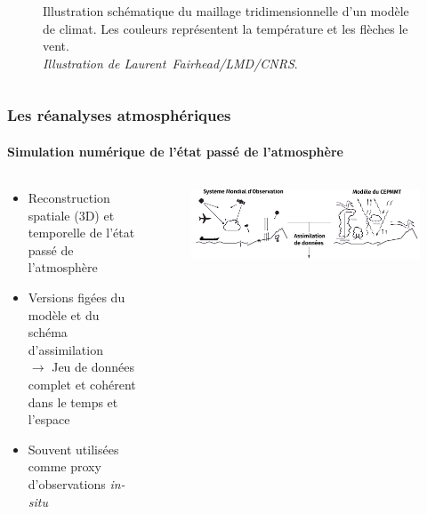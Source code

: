\documentclass[aspectratio=169, usepdftitle=false, xcolor={dvipsnames}, 9pt,table]{beamer}
\begin{document}
\begin{frame}[c]
\begin{columns}
{\begin{column}{0.45\textwidth}
\begin{figure}[t]
                    \captionsetup{width=0.9\textwidth}
                    \caption{Illustration schématique du maillage tridimensionnelle d'un modèle de climat. Les couleurs représentent la température et les flèches
                    le vent.\\\textit{Illustration de \mbox{Laurent Fairhead/LMD/CNRS}}.}
                \end{figure}
            \end{column}
        }
    \end{columns} 
\end{frame}

\begin{frame}
    \frametitle{Les réanalyses atmosphériques}
    \framesubtitle{Simulation numérique de l'état passé de l'atmosphère}
    \begin{columns}[c]
        \begin{column}{0.5\textwidth}
            \footnotesize
            \begin{block}
                \begin{itemize}
                \setlength\itemsep{3.5ex}
                    \item \alert{Reconstruction} spatiale (3D) et temporelle de l'état passé de l'atmosphère
                    \item Versions figées du modèle et du schéma d'assimilation\\
                        $\longrightarrow$ Jeu de données \alert{complet} et \alert{cohérent} dans le temps et l'espace
                    \item Souvent utilisées comme proxy d'observations \textit{in-situ}
                \end{itemize}
            \end{block}
        \end{column}
        \begin{column}{0.5\textwidth}
            \vspace{-2em}
            \begin{figure}
                \centering
                \includegraphics[width=\textwidth]{Figures/schema_reanalyse_top_custom.png}

\end{figure}
\end{column}
\end{columns}
\end{frame}
\end{document}
